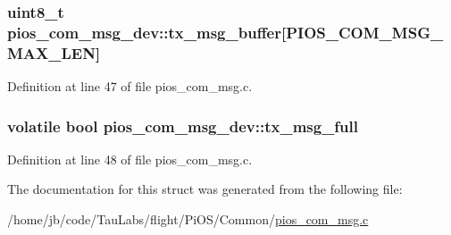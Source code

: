 \hypertarget{structpios__com__msg__dev_a7155e93159cd5cfcd394884b8ceaa78b}{
\subsubsection[{tx\-\_\-msg\-\_\-buffer}]{\setlength{\rightskip}{0pt plus 5cm}uint8\-\_\-t {\bf pios\-\_\-com\-\_\-msg\-\_\-dev\-::tx\-\_\-msg\-\_\-buffer}\mbox{[}\-P\-I\-O\-S\-\_\-\-C\-O\-M\-\_\-\-M\-S\-G\-\_\-\-M\-A\-X\-\_\-\-L\-E\-N\mbox{]}}}\label{structpios__com__msg__dev_a7155e93159cd5cfcd394884b8ceaa78b}


\-Definition at line 47 of file pios\-\_\-com\-\_\-msg.\-c.

\hypertarget{structpios__com__msg__dev_acfd2f035cc532f5f6869277283be397b}{
\subsubsection[{tx\-\_\-msg\-\_\-full}]{\setlength{\rightskip}{0pt plus 5cm}volatile bool {\bf pios\-\_\-com\-\_\-msg\-\_\-dev\-::tx\-\_\-msg\-\_\-full}}}\label{structpios__com__msg__dev_acfd2f035cc532f5f6869277283be397b}


\-Definition at line 48 of file pios\-\_\-com\-\_\-msg.\-c.



\-The documentation for this struct was generated from the following file\-:\begin{DoxyCompactItemize}
\item 
/home/jb/code/\-Tau\-Labs/flight/\-Pi\-O\-S/\-Common/\hyperlink{pios__com__msg_8c}{pios\-\_\-com\-\_\-msg.\-c}\end{DoxyCompactItemize}
